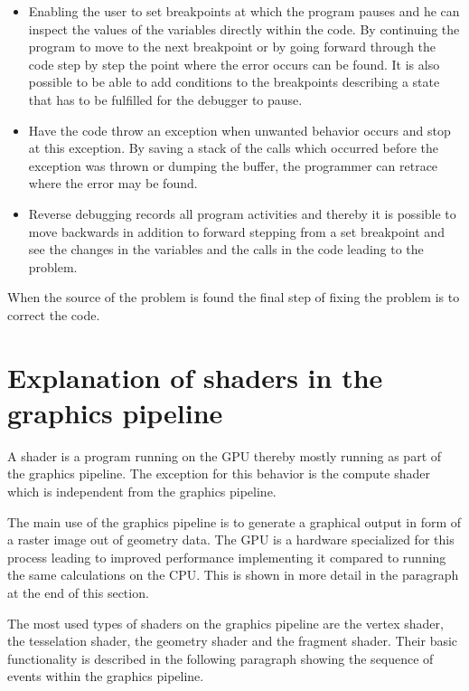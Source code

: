 \begin{itemize}

\item Enabling the user to set breakpoints at which the program pauses and he can inspect the values of the variables directly within the code. By continuing the program to move to the next breakpoint or by going forward through the code step by step the point where the error occurs can be found. It is also possible to be able to add conditions to the breakpoints describing a state that has to be fulfilled for the debugger to pause. 


\item Have the code throw an exception when unwanted behavior occurs and stop at this exception. By saving a stack of the calls which occurred before the exception was thrown or dumping the buffer, the programmer can retrace where the error may be found.


\item Reverse debugging records all program activities and thereby it is possible to move backwards in addition to forward stepping from a set breakpoint and see the changes in the variables and the calls in the code leading to the problem.

\end{itemize}

When the source of the problem is found the final step of fixing the problem is to correct the code.

\section{Explanation of shaders in the graphics pipeline}

A shader is a program running on the GPU thereby mostly running as part of the graphics pipeline. The exception for this behavior is the compute shader which is independent from the graphics pipeline.

The main use of the graphics pipeline is to generate a graphical output in form of a raster image out of geometry data. The GPU is a hardware specialized for this process leading to improved performance implementing it compared to running the same calculations on the CPU. This is shown in more detail in the paragraph at the end of this section.

The most used types of shaders on the graphics pipeline are the vertex shader, the tesselation shader, the geometry shader and the fragment shader. Their basic functionality is described in the following paragraph showing the sequence of events within the graphics pipeline.

